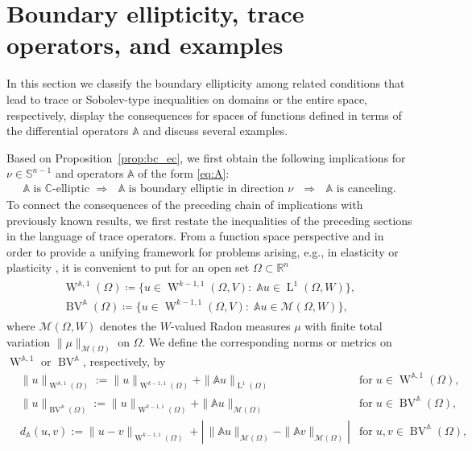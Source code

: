 \documentclass[a4paper,10pt]{amsart}
\newcommand{\R}{\mathbb R}
\newcommand{\lebe}{\operatorname{L}}
\newcommand{\sobo}{\operatorname{W}}
\newcommand{\bv}{\operatorname{BV}}
\newcommand{\A}{\mathbb{A}}
\numberwithin{equation}{section}
\theoremstyle{remark}
\numberwithin{equation}{section}
\begin{document}
	\section{Boundary ellipticity, trace operators, and examples}\label{sec:BVA}
	In this section we classify the boundary ellipticity among related conditions that lead to trace or Sobolev-type inequalities on domains or the entire space, respectively, display the consequences for spaces of functions defined in terms of the differential operators $\A$ and discuss several examples. 
	
	Based on Proposition~\ref{prop:bc_ec}, we first obtain the following implications for $\nu\in\mathbb{S}^{n-1}$ and operators $\A$ of the form \eqref{eq:A}:
	\begin{align}\label{eq:implicationchain}
		{\text{$\A$ is $\mathbb{C}$-elliptic $\Longrightarrow$ $\A$ is boundary elliptic in direction $\nu$ $\Longrightarrow$  $\A$ is canceling.}}
	\end{align}
	To connect the consequences of the preceding chain of implications with previously known results, we first restate the inequalities of the preceding sections in the language of trace operators. From a function space perspective and in order to provide a unifying framework for problems arising, e.g., in elasticity or plasticity \cite{FuchsSeregin,StrangTemam}, it is convenient to put for an open set $\Omega\subset\R^{n}$
	\begin{align}\label{eq:funcspacesDef}
		\begin{split}
			\sobo^{\A,1}(\Omega)\coloneqq\{u\in\sobo^{k-1,1}(\Omega,V)\colon\;\A u\in\lebe^{1}(\Omega,W)\},\\
			\bv^{\A}(\Omega)\coloneqq\{u\in\sobo^{k-1,1}(\Omega,V)\colon\;\A u\in\mathcal{M}(\Omega,W)\}, 
		\end{split}
	\end{align}
	where $\mathcal{M}(\Omega,W)$ denotes the $W$-valued Radon measures $\mu$ with finite total variation $\|\mu\|_{\mathcal{M}(\Omega)}$ on $\Omega$. We define the corresponding norms or metrics on $\sobo^{\A,1}$ or $\bv^{\A}$, respectively, by 
	\begin{align*}
		&\|u\|_{\sobo^{\A,1}(\Omega)}:=\|u\|_{\sobo^{k-1,1}(\Omega)}+\|\A u\|_{\lebe^{1}(\Omega)}&\text{for}\;u\in\sobo^{\A,1}(\Omega),\\ 
		&\|u\|_{\bv^{\A}(\Omega)}:=\|u\|_{\sobo^{k-1,1}(\Omega)}+\|\A u\|_{\mathcal{M}(\Omega)}&\text{for}\;u\in\bv^{\A}(\Omega),\\ 
		&d_{\A}(u,v):=\|u-v\|_{\sobo^{k-1,1}(\Omega)}+|\,\|\A u\|_{\mathcal{M}(\Omega)}-\|\A v\|_{\mathcal{M}(\Omega)}|&\text{for}\;u,v\in\bv^{\A}(\Omega),
	\end{align*}
\end{document}
